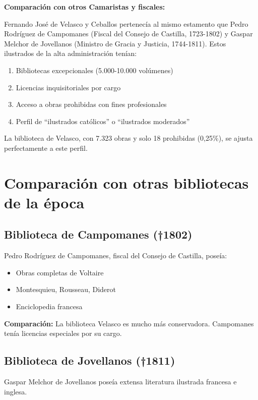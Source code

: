 \documentclass[12pt,a4paper]{article}
\begin{document}
\textbf{Comparación con otros Camaristas y fiscales:}

Fernando José de Velasco y Ceballos pertenecía al mismo estamento que Pedro Rodríguez de Campomanes (Fiscal del Consejo de Castilla, 1723-1802) y Gaspar Melchor de Jovellanos (Ministro de Gracia y Justicia, 1744-1811). Estos ilustrados de la alta administración tenían:

\begin{enumerate}
    \item Bibliotecas excepcionales (5.000-10.000 volúmenes)
    \item Licencias inquisitoriales por cargo
    \item Acceso a obras prohibidas con fines profesionales
    \item Perfil de ``ilustrados católicos'' o ``ilustrados moderados''
\end{enumerate}

La biblioteca de Velasco, con 7.323 obras y solo 18 prohibidas (0,25\%), se ajusta perfectamente a este perfil.

\section{Comparación con otras bibliotecas de la época}

\subsection{Biblioteca de Campomanes (†1802)}

Pedro Rodríguez de Campomanes, fiscal del Consejo de Castilla, poseía:

\begin{itemize}
    \item Obras completas de Voltaire
    \item Montesquieu, Rousseau, Diderot
    \item Enciclopedia francesa
\end{itemize}

\textbf{Comparación:} La biblioteca Velasco es mucho más conservadora. Campomanes tenía licencias especiales por su cargo.

\subsection{Biblioteca de Jovellanos (†1811)}

Gaspar Melchor de Jovellanos poseía extensa literatura ilustrada francesa e inglesa.
\end{document}
